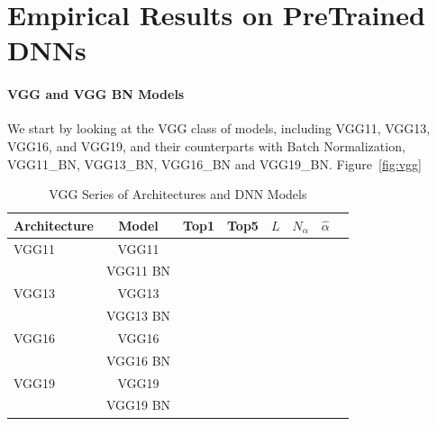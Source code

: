 \vspace{-4mm}

\section{Empirical Results on PreTrained DNNs}
\label{sxn:emp}

\paragraph{VGG and VGG BN Models}

We start by looking at the VGG class of models, including VGG11, VGG13, VGG16, and VGG19, and their counterparts with Batch Normalization, 
VGG11\_BN, VGG13\_BN, VGG16\_BN and VGG19\_BN.  Figure~\ref{fig:vgg}

\begin{table}[t]
\small
\begin{center}
\begin{tabular}{|p{1in}|c|c|c|c|c|c|c|}
\hline
Architecture 
 & Model &Top1 
 & Top5 & $L$ & $N_{\alpha}$ & $\hat{\alpha}$ \\
\hline
VGG11 & VGG11 & & & & & \\
  & VGG11 BN & & & & & \\
\hline
VGG13 & VGG13 & & & & & \\
  & VGG13 BN & & & & & \\
\hline
VGG16 & VGG16 & & & & & \\
  & VGG16 BN & & & & & \\
\hline
VGG19 & VGG19 & & & & & \\
  & VGG19 BN & & & & & \\
\hline
\end{tabular}
\end{center}
\caption{VGG Series of Architectures and DNN Models}
\label{table:models}
\end{table}


